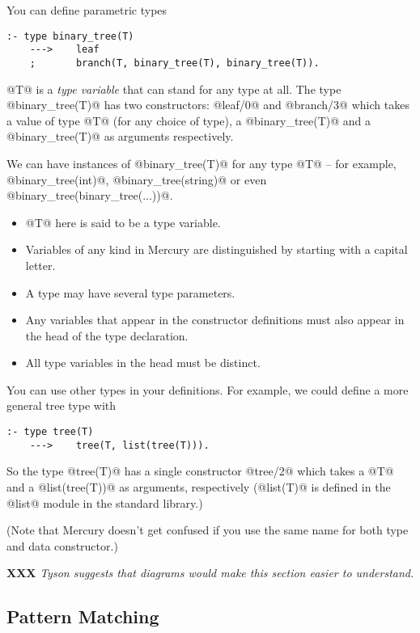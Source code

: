 \documentclass[a4paper,11pt,notitlepage,onecolumn]{article}
\newcommand{\XXX}[1]%
{{\small\textbf{XXX} \emph{#1}}}
\begin{document}
You can define parametric types
\begin{verbatim}
:- type binary_tree(T)
    --->    leaf
    ;       branch(T, binary_tree(T), binary_tree(T)).
\end{verbatim}

@T@ is a \emph{type variable} that can stand for any type at all.
The type @binary_tree(T)@ has two constructors: @leaf/0@ and
@branch/3@ which takes a value of type @T@ (for any choice of
type), a @binary_tree(T)@ and a @binary_tree(T)@ as arguments
respectively.

We can have instances of @binary_tree(T)@ for any type @T@ -- for
example, @binary_tree(int)@, @binary_tree(string)@ or even
@binary_tree(binary_tree(...))@.

\begin{itemize}
\item @T@ here is said to be a type variable.
\item Variables of any kind in Mercury are distinguished by
  starting with a capital letter.
\item A type may have several type parameters.
\item Any variables that appear in the constructor definitions
  must also appear in the head of the type declaration.
\item All type variables in the head must be distinct.
\end{itemize}

You can use other types in your definitions.  For example, we
could define a more general tree type with
\begin{verbatim}
:- type tree(T)
    --->    tree(T, list(tree(T))).
\end{verbatim}
So the type @tree(T)@ has a single constructor @tree/2@ which
takes a @T@ and a @list(tree(T))@ as arguments, respectively
(@list(T)@ is defined in the @list@ module in the standard
library.)

(Note that Mercury doesn't get confused if you use the same
name for both type and data constructor.)

\XXX{Tyson suggests that diagrams would make this section
easier to understand.}

\subsection{Pattern Matching}
\end{document}
